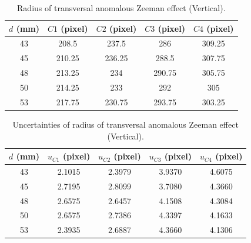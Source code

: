 \documentclass[a4paper,12pt]{article}
\begin{document}
    \begin{table}[H]
        \centering
        \caption{Radius of transversal anomalous Zeeman effect (Vertical).}
        \begin{tabular}{c|c|c|c|c}
            $d $ (mm)& $C1 $ (pixel)& $C2 $ (pixel)& $C3 $ (pixel)& $C4 $ (pixel) \\ \hline \hline
            43&	208.5	&237.5	&286	&309.25 \\ \hline
            45&	210.25	&236.25	&288.5	&307.75 \\ \hline
            48&	213.25	&234	&290.75	&305.75 \\ \hline
            50&	214.25	&233	&292	&305 \\ \hline
            53&	217.75	&230.75	&293.75	&303.25 \\ \hline
        \end{tabular}
        \label{tab:tra_ano_ver}
    \end{table}
    
    \begin{table}[H]
        \centering
        \caption{Uncertainties of radius of transversal anomalous Zeeman effect (Vertical).}
        \begin{tabular}{c|c|c|c|c}
            $d $ (mm)& $u_{C1} $ (pixel)& $u_{C2} $ (pixel)& $u_{C3} $ (pixel)& $u_{C4} $ (pixel)  \\ \hline \hline
            43&2.1015&2.3979&3.9370&4.6075  \\ \hline
            45&2.7195&2.8099&3.7080&4.3660 \\ \hline
            48&2.6575&2.6457&4.1508&4.3084  \\ \hline
            50&2.6575&2.7386&4.3397&4.1633 \\ \hline
            53&2.3935&2.6887&4.3660&4.1306 \\ \hline
        \end{tabular}
        \label{tab:tra_ano_ver_un}
    \end{table}
    
\end{document}
